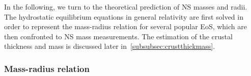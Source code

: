 
In the following, we turn to the theoretical prediction of NS masses and radii. 
The hydrostatic equilibrium equations in general relativity are first solved in 
order to represent the mass-radius relation for several popular EoS, which are
then confronted to NS mass measurements. The estimation of the crustal 
thickness and mass is discussed later in~\ref{subsubsec:crustthickmass}.

\subsubsection{Mass-radius relation}

